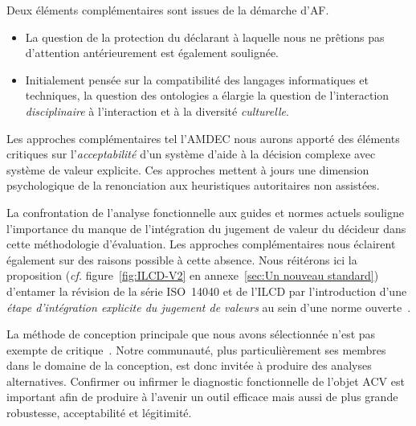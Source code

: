 Deux éléments complémentaires sont issues de la démarche d'\gls{AF}.
\begin{itemize}
\item La question de la protection du déclarant à laquelle nous ne prêtions pas d'attention antérieurement est également soulignée.
\item Initialement pensée sur la compatibilité des langages informatiques et techniques, la question des ontologies a élargie la question de l'interaction \emph{disciplinaire} à l'interaction et à la diversité \emph{culturelle}.
\end{itemize}

Les approches complémentaires tel l'AMDEC nous aurons apporté des éléments critiques sur l'\emph{acceptabilité} d'un système d'aide à la décision complexe avec système de valeur explicite.
Ces approches mettent à jours une dimension psychologique de la renonciation aux heuristiques autoritaires non assistées.

La confrontation de l'analyse fonctionnelle aux guides et normes actuels souligne l'importance du manque de l'intégration du jugement de valeur du décideur dans cette méthodologie d'évaluation.
Les approches complémentaires nous éclairent également sur des raisons possible à cette absence.
Nous réitérons ici la proposition (\textit{cf.} figure~\ref{fig:ILCD-V2} en annexe~\ref{sec:Un nouveau standard}) d’entamer la révision de la série ISO~14040 et de l'ILCD par l'introduction d'une \emph{étape d'intégration explicite du jugement de valeurs} au sein d'une norme ouverte~\cite{patard_life_2015}.

La méthode de conception principale que nous avons sélectionnée n'est pas exempte de critique~\cite{darses_francoise_assister_2001}.
Notre communauté, plus particulièrement ses membres dans le domaine de la conception, est donc invitée à produire des analyses alternatives. %
Confirmer ou infirmer le diagnostic fonctionnelle de l'objet \gls{ACV} est important afin de produire à l'avenir un outil efficace mais aussi de plus grande robustesse, acceptabilité et légitimité.

% 


